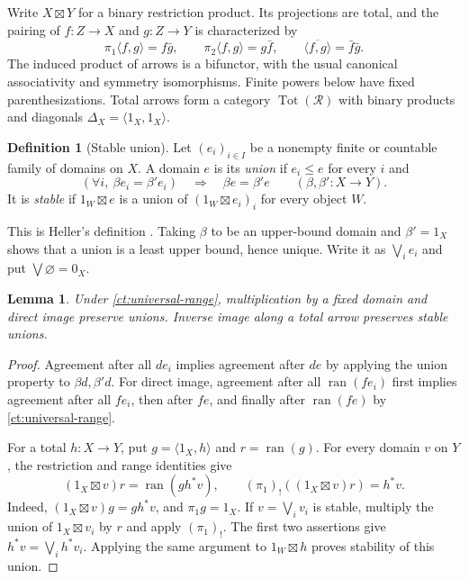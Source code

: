 \documentclass[11pt]{article}
\newtheorem{lemma}[theorem]{Lemma}
\theoremstyle{definition}
\newtheorem{definition}[theorem]{Definition}
\theoremstyle{remark}
\newcommand{\R}{\mathscr R}
\newcommand{\ran}{\operatorname{ran}}
\newcommand{\Tot}{\operatorname{Tot}}
\begin{document}
Write $X\boxtimes Y$ for a binary restriction product. Its projections are
total, and the pairing of $f:Z\to X$ and $g:Z\to Y$ is characterized by
\[
 \pi_1\langle f,g\rangle=f\bar g,\qquad
 \pi_2\langle f,g\rangle=g\bar f,\qquad
 \overline{\langle f,g\rangle}=\bar f\bar g.
\]
The induced product of arrows is a bifunctor, with the usual canonical
associativity and symmetry isomorphisms. Finite powers below have fixed
parenthesizations. Total arrows form a category $\Tot(\R)$ with binary
products and diagonals $\Delta_X=\langle1_X,1_X\rangle$.

\begin{definition}[Stable union]\label{ct:stable-union}
Let $(e_i)_{i\in I}$ be a nonempty finite or countable family of domains on
$X$. A domain $e$ is its \emph{union} if $e_i\le e$ for every $i$ and
\[
 (\forall i,\ \beta e_i=\beta'e_i)
 \quad\Longrightarrow\quad \beta e=\beta'e
 \qquad(\beta,\beta':X\to Y).
\]
It is \emph{stable} if $1_W\boxtimes e$ is a union of
$(1_W\boxtimes e_i)_i$ for every object $W$.
\end{definition}

This is Heller's definition \cite[\S6, p.~1262]{Heller}. Taking $\beta$ to
be an upper-bound domain and $\beta'=1_X$ shows that a union is a least
upper bound, hence unique. Write it as $\bigvee_i e_i$ and put
$\bigvee\varnothing=0_X$.

\begin{lemma}\label{ct:union-calculus}
Under \eqref{ct:universal-range}, multiplication by a fixed domain and
direct image preserve unions. Inverse image along a total arrow preserves
stable unions. \end{lemma}
\begin{proof}
Agreement after all $de_i$ implies agreement after $de$ by applying the
union property to $\beta d,\beta'd$. For direct image, agreement after
all $\ran(fe_i)$ first implies agreement after all $fe_i$, then after
$fe$, and finally after $\ran(fe)$ by \eqref{ct:universal-range}.

For a total $h:X\to Y$, put $g=\langle1_X,h\rangle$ and $r=\ran(g)$.
For every domain $v$ on $Y$, the restriction and range identities give
\[
 (1_X\boxtimes v)r=\ran(g h^*v),\qquad
 (\pi_1)_!((1_X\boxtimes v)r)=h^*v.
\]
Indeed, $(1_X\boxtimes v)g=g h^*v$, and $\pi_1g=1_X$.
If $v=\bigvee_i v_i$ is stable, multiply the union of
$1_X\boxtimes v_i$ by $r$ and apply $(\pi_1)_!$.
The first two assertions give $h^*v=\bigvee_i h^*v_i$.
Applying the same argument to $1_W\boxtimes h$ proves stability of this
union.

\end{proof}
\end{document}

